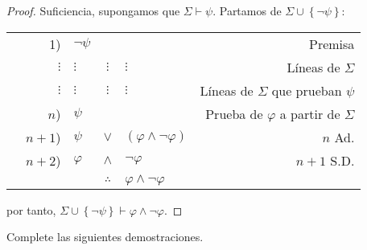 \documentclass[12pt]{report}
\theoremstyle{largebreak}
\begin{document}
\begin{proof}
        Suficiencia, supongamos que $\Sigma\vdash\psi$. Partamos de $\Sigma\cup\left\{\neg\psi\right\}$:
        \begin{center}
            \begin{tabular}{l r l c l r}
                 & 1) & $\neg\psi$ &  &  & Premisa \\
                & $\vdots$ & $\vdots$ & $\vdots$ & $\vdots$ & Líneas de $\Sigma$ \\
                & $\vdots$ & $\vdots$ & $\vdots$ & $\vdots$ & Líneas de $\Sigma$ que prueban $\psi$ \\
                & $n$) & $\psi$ &  &  & Prueba de $\varphi$ a partir de $\Sigma$ \\
                & $n+1$) & $\psi$ & $\lor$ & $(\varphi\land\neg\varphi)$ & $n$ Ad. \\
                & $n+2$) & $\varphi$ & $\land$ & $\neg\varphi$ & $n+1$ S.D. \\
                \hline
                & & & $\therefore$ & $\varphi\land\neg\varphi$ & \\
            \end{tabular}
        \end{center}
        por tanto, $\Sigma\cup\left\{\neg\psi\right\}\vdash\varphi\land\neg\varphi$.
    \end{proof}

    \begin{excer}
        Complete las siguientes demostraciones.
    \end{excer}
\end{document}
